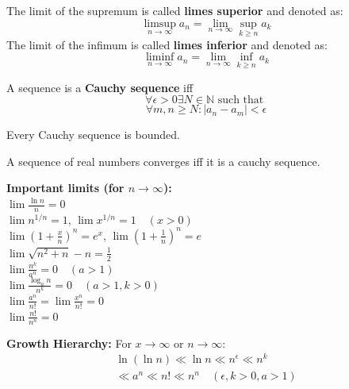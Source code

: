 \begin{definition}
    The limit of the supremum is called \textbf{limes superior} and denoted as:
    $$\limsup_{n \to \infty} a_n = \lim_{n \to \infty} \sup_{k \ge n} a_k$$
    The limit of the infimum is called \textbf{limes inferior} and denoted as:
    $$\liminf_{n \to \infty} a_n = \lim_{n \to \infty} \inf_{k \ge n} a_k$$
\end{definition}

\begin{definition}
    A sequence is a \textbf{Cauchy sequence} iff 
    $$\forall \epsilon \gt 0 \exists N \in \mathbb{N} \text{ such that }$$
    $$\forall m, n \ge N : |a_n - a_m| \lt \epsilon$$
\end{definition}

\begin{theorem}
    Every Cauchy sequence is bounded.
\end{theorem}

\begin{theorem}
    A sequence of real numbers converges iff it is a cauchy sequence.
\end{theorem}

\begin{remark}
    \textbf{Important limits (for $n \to \infty$):} \\
    $\lim \frac{\ln n}{n} = 0$ \\
    $\lim n^{1/n} = 1$, $\lim x^{1/n} = 1 \quad (x \gt 0)$ \\
    $\lim \left(1 + \frac{x}{n}\right)^n = e^x$, $\lim \left(1 + \frac{1}{n}\right)^n = e$ \\
    $\lim \sqrt{n^2+n} - n = \frac{1}{2}$ \\
    $\lim \frac{n^k}{a^n} = 0 \quad (a \gt 1)$ \\
    $\lim \frac{\log_a n}{n^k} = 0 \quad (a \gt 1, k \gt 0)$ \\
    $\lim \frac{a^n}{n!} = \lim \frac{x^n}{n!} = 0$ \\
    $\lim \frac{n!}{n^n} = 0$
\end{remark}

\begin{theorem}
    \textbf{Growth Hierarchy:} For $x \to \infty$ or $n \to \infty$:
    \begin{gather*}
        \ln(\ln n) \ll \ln n \ll n^\epsilon \ll n^k \\
        \ll a^n \ll n! \ll n^n \quad (\epsilon, k > 0, a > 1)
    \end{gather*}
\end{theorem}

